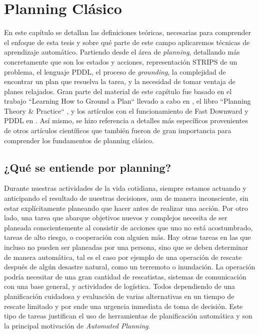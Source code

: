 \chapter{Planning Clásico}
\label{ch:lit_planning}

En este capítulo se detallan las definiciones teóricas, necesarias
para comprender el enfoque de esta tesis y sobre qué parte de este campo
aplicaremos técnicas de aprendizaje automático. Partiendo desde el área de
\emph{planning}, detallando más concretamente que son los estados y acciones,
representación STRIPS de un problema, el lenguaje PDDL, el proceso de
\emph{grounding}, la complejidad de encontrar un plan que resuelva la tarea, y
la necesidad de tomar ventaja de planes relajados. Gran parte del material de
este capítulo fue basado en el trabajo ``Learning How to Ground a Plan`` llevado
a cabo en \citep{Gnad_Torralba_Dominguez_Areces_Bustos_2019}, el libro
``Planning Theory \& Practice`` \citep{Nau-Ghallab-Malik-Traverso-2004}, y los
artículos con el funcionamiento de Fast Downward y PDDL en \citep{Helmert-2011,
McDermott1998}. Así mismo, se hizo referencia a detalles más específicos
provenientes de otros artículos científicos que también fueron de gran
importancia para comprender los fundamentos de planning clásico.

\section{¿Qué se entiende por planning?}

Durante nuestras actividades de la vida cotidiana, siempre estamos actuando y
anticipando el resultado de nuestras decisiones, aun de manera inconsciente, sin
estar explícitamente planeando que hacer antes de realizar una acción. Por otro
lado, una tarea que abarque objetivos nuevos y complejos necesita de ser
planeada conscientemente al consistir de acciones que uno no está acostumbrado,
tareas de alto riesgo, o cooperación con alguien más. Hay otras tareas en las
que incluso no pueden ser planeadas por una persona, sino que se deben
determinar de manera automática, tal es el caso por ejemplo de una operación de
rescate después de algún desastre natural, como un terremoto o
inundación. La operación podría necesitar de una gran cantidad de rescatistas,
sistemas de comunicación con una base general, y actividades de logística. Todos
dependiendo de una planificación cuidadosa y evaluación de varias alternativas
en un tiempo de rescate limitado y por ende una urgencia inmediata de toma de
decisión. Este tipo de tareas justifican el uso de herramientas de planificación
automática y son la principal motivación de \emph{Automated Planning}.

